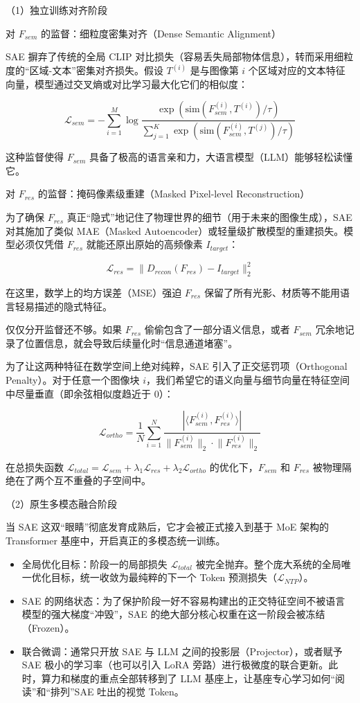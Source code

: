 （1）独立训练对齐阶段

对 \(F_{sem}\) 的监督：细粒度密集对齐（Dense Semantic Alignment）

SAE 摒弃了传统的全局 CLIP 对比损失（容易丢失局部物体信息），转而采用细粒度的``区域-文本''密集对齐损失。假设 \(T^{(i)}\) 是与图像第 \(i\) 个区域对应的文本特征向量，模型通过交叉熵或对比学习最大化它们的相似度：

\[
\mathcal{L}_{sem}=-\sum_{i=1}^{M}\log
\frac{\exp(\mathrm{sim}(F_{sem}^{(i)},T^{(i)})/\tau)}
{\sum_{j=1}^{K}\exp(\mathrm{sim}(F_{sem}^{(i)},T^{(j)})/\tau)}
\]

这种监督使得 \(F_{sem}\) 具备了极高的语言亲和力，大语言模型（LLM）能够轻松读懂它。

对 \(F_{res}\) 的监督：掩码像素级重建（Masked Pixel-level Reconstruction）

为了确保 \(F_{res}\) 真正``隐式''地记住了物理世界的细节（用于未来的图像生成），SAE 对其施加了类似 MAE（Masked Autoencoder）或轻量级扩散模型的重建损失。模型必须仅凭借 \(F_{res}\) 就能还原出原始的高频像素 \(I_{target}\)：

\[
\mathcal{L}_{res}=\lVert D_{recon}(F_{res})-I_{target}\rVert_2^2
\]

在这里，数学上的均方误差（MSE）强迫 \(F_{res}\) 保留了所有光影、材质等不能用语言轻易描述的隐式特征。

仅仅分开监督还不够。如果 \(F_{res}\) 偷偷包含了一部分语义信息，或者 \(F_{sem}\) 冗余地记录了位置信息，就会导致后续量化时``信息通道堵塞''。

为了让这两种特征在数学空间上绝对纯粹，SAE 引入了正交惩罚项（Orthogonal Penalty）。对于任意一个图像块 \(i\)，我们希望它的语义向量与细节向量在特征空间中尽量垂直（即余弦相似度趋近于 0）：

\[
\mathcal{L}_{ortho}=\frac{1}{N}\sum_{i=1}^{N}
\frac{|\langle F_{sem}^{(i)},F_{res}^{(i)}\rangle|}
{\lVert F_{sem}^{(i)}\rVert_2\cdot \lVert F_{res}^{(i)}\rVert_2}
\]

在总损失函数 \(\mathcal{L}_{total}=\mathcal{L}_{sem}+\lambda_1\mathcal{L}_{res}+\lambda_2\mathcal{L}_{ortho}\) 的优化下，\(F_{sem}\) 和 \(F_{res}\) 被物理隔绝在了两个互不重叠的子空间中。

（2）原生多模态融合阶段

当 SAE 这双``眼睛''彻底发育成熟后，它才会被正式接入到基于 MoE 架构的 Transformer 基座中，开启真正的多模态统一训练。

\begin{itemize}
\tightlist
\item
  全局优化目标：阶段一的局部损失 \(\mathcal{L}_{total}\) 被完全抛弃。整个庞大系统的全局唯一优化目标，统一收敛为最纯粹的下一个 Token 预测损失（\(\mathcal{L}_{NTP}\)）。
\item
  SAE 的网络状态：为了保护阶段一好不容易构建出的正交特征空间不被语言模型的强大梯度``冲毁''，SAE 的绝大部分核心权重在这一阶段会被冻结（Frozen）。
\item
  联合微调：通常只开放 SAE 与 LLM 之间的投影层（Projector），或者赋予 SAE 极小的学习率（也可以引入 LoRA 旁路）进行极微度的联合更新。此时，算力和梯度的重点全部转移到了 LLM 基座上，让基座专心学习如何``阅读''和``排列''SAE 吐出的视觉 Token。
\end{itemize}

